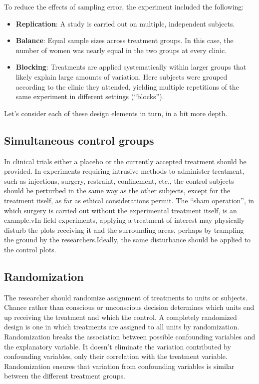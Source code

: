 \documentclass[]{book}
\providecommand{\tightlist}{%
  \setlength{\itemsep}{0pt}\setlength{\parskip}{0pt}}
\begin{document}
To reduce the effects of sampling error, the experiment included the following:

\begin{itemize}
\tightlist
\item
  \textbf{Replication}: A study is carried out on multiple, independent subjects.
\item
  \textbf{Balance}: Equal sample sizes across treatment groups. In this case, the number of women was nearly equal in the two groups at every clinic.
\item
  \textbf{Blocking}: Treatments are applied systematically within larger groups that likely explain large amounts of variation. Here subjects were grouped according to the clinic they attended, yielding multiple repetitions of the same experiment in different settings (``blocks'').
\end{itemize}

Let's consider each of these design elements in turn, in a bit more depth.

\hypertarget{simultaneous-control-groups}{%
\subsection{Simultaneous control groups}\label{simultaneous-control-groups}}

In clinical trials either a placebo or the currently accepted treatment should be provided. In experiments requiring intrusive methods to administer treatment, such as injections, surgery, restraint, confinement, etc., the control subjects should be perturbed in the same way as the other subjects, except for the treatment itself, as far as ethical considerations permit. The ``sham operation'', in which surgery is carried out without the experimental treatment itself, is an example.vIn field experiments, applying a treatment of interest may physically disturb the plots receiving it and the surrounding areas, perhaps by trampling the ground by the researchers.Ideally, the same disturbance should be applied to the control plots.

\hypertarget{randomization}{%
\subsection{Randomization}\label{randomization}}

The researcher should randomize assignment of treatments to units or subjects. Chance rather than conscious or unconscious decision determines which units end up receiving the treatment and which the control. A completely randomized design is one in which treatments are assigned to all units by randomization. Randomization breaks the association between possible confounding variables and the explanatory variable. It doesn't eliminate the variation contributed by confounding variables, only their correlation with the treatment variable. Randomization ensures that variation from confounding variables is similar between the different treatment groups.
\end{document}
